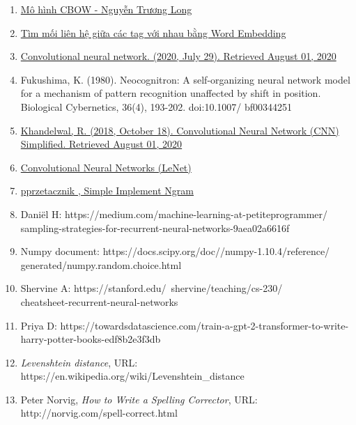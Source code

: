 \begin{enumerate}
\item \label{refer:13} \href{https://nguyentruonglong.net/mo-hinh-cbow-continuous-bag-of-words.html}{Mô hình CBOW - Nguyễn Trương Long}
\item \label{refer:14} \href{https://pixta.vn/tim-moi-lien-he-giua-cac-tag-voi-nhau-bang-word-embedding/}{Tìm mối liên hệ giữa các tag với nhau bằng Word Embedding}
\item \label{refer:15} \href{https://en.wikipedia.org/wiki/Convolutional_neural_network}{Convolutional neural network. (2020, July 29). Retrieved August 01, 2020}
\item \label{refer:16} Fukushima, K. (1980). Neocognitron: A self-organizing neural network model for a mechanism of pattern recognition unaffected by shift in position. Biological Cybernetics, 36(4), 193-202. doi:10.1007/ bf00344251
\item \label{refer:17} \href{https://medium.com/datadriveninvestor/convolutional-neural-network-cnn-simplified-ecafd4ee52c5}{Khandelwal, R. (2018, October 18). Convolutional Neural Network (CNN) Simplified. Retrieved August 01, 2020}
\item \label{refer:18} \href{http://deeplearning.net/tutorial/lenet.html}{Convolutional Neural Networks (LeNet)}
\item \label{refer:19} \href{https://github.com/pprzetacznik/nlp-n-grams}{pprzetacznik , Simple Implement Ngram}

\item \label{refer:20} Daniël H: https://medium.com/machine-learning-at-petiteprogrammer/\\sampling-strategies-for-recurrent-neural-networks-9aea02a6616f
\item \label{refer:21} Numpy document: https://docs.scipy.org/doc//numpy-1.10.4/reference/\\generated/numpy.random.choice.html
\item \label{refer:22} Shervine A: https://stanford.edu/~shervine/teaching/cs-230/\\cheatsheet-recurrent-neural-networks
\item \label{refer:23} Priya D:
https://towardsdatascience.com/train-a-gpt-2-transformer-to-write-harry-potter-books-edf8b2e3f3db

\item \label{refer:24} \textit{Levenshtein distance}, URL: https://en.wikipedia.org/wiki/Levenshtein\_distance
\item \label{refer:25} Peter Norvig, \textit{How to Write a Spelling Corrector}, URL: http://norvig.com/spell-correct.html
\end{enumerate}